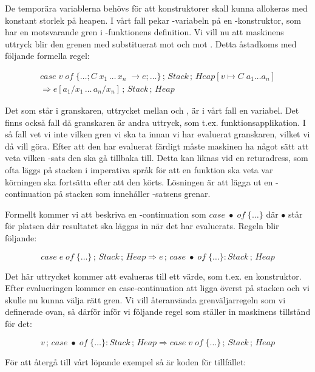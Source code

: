 \documentclass[../Core]{subfiles}
\begin{document}
De temporära variablerna behövs för att konstruktorer skall kunna
allokeras med konstant storlek på heapen. I vårt fall pekar
-variabeln på en -konstruktor, som har en motsvarande gren
i -funktionens definition. Vi vill nu att maskinens uttryck
blir den grenen med  substituerat mot  och  mot .
Detta åstadkoms med följande formella regel:

\begin{multline*}
case\; v\; of\;\{\ldots;C\; x_{1}\,\ldots\, x_{n}\;\rightarrow e;\ldots\}\,;\, Stack\,;\, Heap[v\mapsto C\; a_{1}\ldots a_{n}]\\
\Rightarrow e[a_{1}/x_{1}\,\ldots\, a_{n}/x_{n}]\,;\, Stack\,;\, Heap\end{multline*}


Det som står i granskaren, uttrycket mellan  och , är i vårt
fall en variabel. Det finns också fall då granskaren är andra uttryck, som
t.ex. funktionsapplikation. I så fall vet vi inte vilken gren vi ska
ta innan vi har evaluerat granskaren, vilket vi då vill göra.
Efter att den har evaluerat färdigt måste maskinen ha något sätt att
veta vilken -sats den ska gå tillbaka till. Detta kan liknas
vid en returadress, som ofta läggs på stacken i imperativa språk för att
en funktion ska veta var körningen ska fortsätta efter att den körts.
Lösningen är att lägga ut en -continuation på stacken
som innehåller -satsens grenar.

Formellt kommer vi att beskriva en -continuation som $case\;\bullet\; of\;\{\ldots\}$
där $\bullet$ står för platsen där resultatet ska läggas in när det har evaluerats. Regeln
blir följande:

\[
case\; e\; of\;\{\ldots\}\,;\, Stack\,;\, Heap\Rightarrow e\,;\, case\;\bullet\; of\;\{\ldots\}:Stack\,;\, Heap\]


Det här uttrycket kommer att evalueras till ett värde, som t.ex. en konstruktor.
Efter evalueringen kommer en case-continuation att ligga överst på stacken och vi skulle nu kunna välja
rätt gren. Vi vill återanvända grenväljarregeln som vi definerade
ovan, så därför inför vi följande regel som ställer in maskinens tillstånd för det:

\[
v\,;\, case\;\bullet\; of\;\{\ldots\}:Stack\,;\, Heap\Rightarrow case\; v\; of\;\{\ldots\}\,;\, Stack\,;\, Heap\]


För att återgå till vårt löpande exempel så är koden för tillfället:
\end{document}
